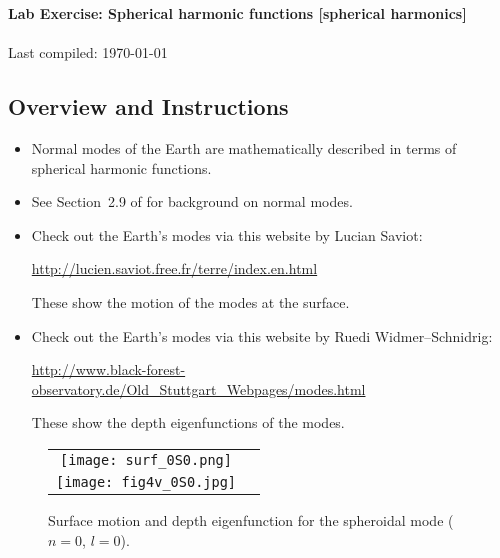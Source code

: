 \documentclass[11pt,titlepage,fleqn]{article}
\begin{document}

\begin{spacing}{1.2} 
\centering
{\large \bf Lab Exercise: Spherical harmonic functions [spherical harmonics]} \\
\cltag\ \\
Last compiled: \today
\end{spacing}

\subsection*{Overview and Instructions}

\begin{itemize}
\item Normal modes of the Earth are mathematically described in terms of spherical harmonic functions.

\item See Section~2.9 of \citet{SteinWysession} for background on normal modes.

\item Check out the Earth's modes via this website by Lucian Saviot:

\url{http://lucien.saviot.free.fr/terre/index.en.html}

These show the motion of the modes at the surface.

\item Check out the Earth's modes via this website by Ruedi Widmer--Schnidrig:

\url{http://www.black-forest-observatory.de/Old_Stuttgart_Webpages/modes.html}

These show the depth eigenfunctions of the modes.

\end{itemize}


\begin{figure}[h]
\centering
\begin{tabular}{cc}
\texttt{[image: surf\_0S0.png]} \\
\texttt{[image: fig4v\_0S0.jpg]} 
\end{tabular}
\caption[]
{{
Surface motion and depth eigenfunction for the spheroidal mode  ($n=0$, $l=0$).
}}
\label{fig:ex}
\end{figure}

\end{document}
